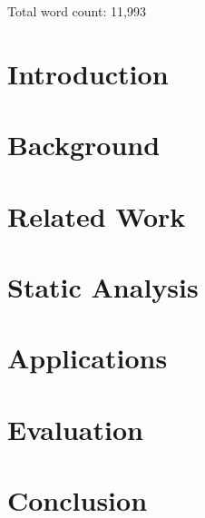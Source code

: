 \documentclass[12pt,a4paper,twoside,openright,notitlepage]{report}
\begin{document}

% 

\thispagestyle{plain}



\clearpage

\thispagestyle{plain}

Total word count: 11,993

\clearpage


\tableofcontents

\clearpage


\chapter{Introduction}



\chapter{Background}



\chapter{Related Work}



\chapter{Static Analysis}



\chapter{Applications}



\chapter{Evaluation}



\chapter{Conclusion}



\printbibliography
\end{document}
